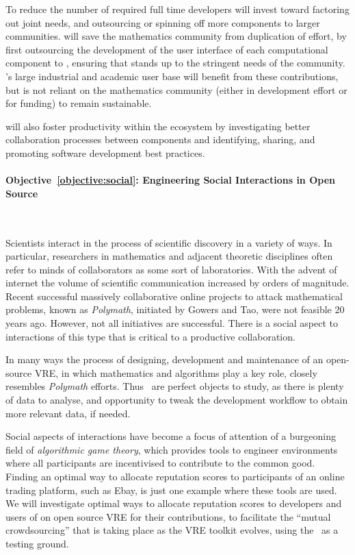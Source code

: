 \documentclass[noworkareas,deliverables,\classoptions]{euproposal}       %
\begin{document}
\begin{proposal}

To reduce the number of required full time developers \TheProject will
invest toward factoring out joint needs, and outsourcing or spinning
off more components to larger communities.  \TheProject will save the
mathematics community from duplication of effort, by first outsourcing
the development of the user interface of each computational component
to \Jupyter, ensuring that \Jupyter stands up to the stringent needs
of the community. \Jupyter's large industrial and academic user base
will benefit from these contributions, but is not reliant on the
mathematics community (either in development effort or for funding) to
remain sustainable.

\TheProject will also foster productivity within the ecosystem by
investigating better collaboration processes between components and
identifying, sharing, and promoting software development best
practices.

\paragraph{Objective~\ref{objective:social}: Engineering Social
  Interactions in Open Source \VREs}\

Scientists interact in the process of scientific discovery in a
variety of ways.  In particular, researchers in mathematics and
adjacent theoretic disciplines often refer to minds of collaborators
as some sort of laboratories. With the advent of internet the volume
of scientific communication increased by orders of magnitude. Recent
successful massively collaborative online projects to attack
mathematical problems, known as \emph{Polymath}, initiated by Gowers
and Tao, were not feasible 20 years ago. However, not all initiatives
are successful. There is a social aspect to interactions of this type
that is critical to a productive collaboration.

In many ways the process of designing, development and maintenance of
an open-source VRE, in which mathematics and algorithms play a key
role, closely resembles \emph{Polymath} efforts.  Thus \TheProject\
\VREs are perfect objects to study, as there is plenty of data to
analyse, and opportunity to tweak the development workflow to obtain
more relevant data, if needed.

Social aspects of interactions have become a focus of attention of a
burgeoning field of \emph{algorithmic game theory}, which provides
tools to engineer environments where all participants are incentivised
to contribute to the common good.  Finding an optimal way to allocate
reputation scores to participants of an online trading platform, such
as Ebay, is just one example where these tools are used. We will
investigate optimal ways to allocate reputation scores to developers
and users of on open source VRE for their contributions, to facilitate
the ``mutual crowdsourcing'' that is taking place as the VRE toolkit
evolves, using the \TheProject\ \VREs as a testing ground.


\end{proposal}
\end{document}

